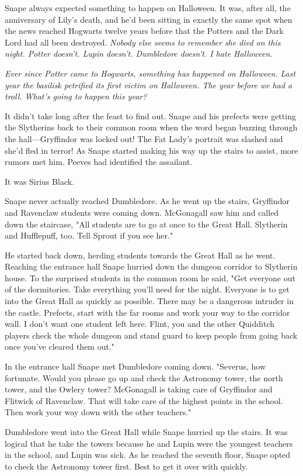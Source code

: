 Snape always expected something to happen on Halloween. It was, after all, the anniversary of Lily's death, and he'd been sitting in exactly the same spot when the news reached Hogwarts twelve years before that the Potters and the Dark Lord had all been destroyed. \emph{Nobody else seems to remember she died on this night. Potter doesn't. Lupin doesn't. Dumbledore doesn't. I hate Halloween.}

\emph{Ever since Potter came to Hogwarts, something has happened on Halloween. Last year the basilisk petrified its first victim on Halloween. The year before we had a troll. What's going to happen this year?}

It didn't take long after the feast to find out. Snape and his prefects were getting the Slytherins back to their common room when the word began buzzing through the hall—Gryffindor was locked out! The Fat Lady's portrait was slashed and she'd fled in terror! As Snape started making his way up the stairs to assist, more rumors met him. Peeves had identified the assailant.

It was Sirius Black.

Snape never actually reached Dumbledore. As he went up the stairs, Gryffindor and Ravenclaw students were coming down. McGonagall saw him and called down the staircase, "All students are to go at once to the Great Hall. Slytherin and Hufflepuff, too. Tell Sprout if you see her."

He started back down, herding students towards the Great Hall as he went. Reaching the entrance hall Snape hurried down the dungeon corridor to Slytherin house. To the surprised students in the common room he said, "Get everyone out of the dormitories. Take everything you'll need for the night. Everyone is to get into the Great Hall as quickly as possible. There may be a dangerous intruder in the castle. Prefects, start with the far rooms and work your way to the corridor wall. I don't want one student left here. Flint, you and the other Quidditch players check the whole dungeon and stand guard to keep people from going back once you've cleared them out."

In the entrance hall Snape met Dumbledore coming down. "Severus, how fortunate. Would you please go up and check the Astronomy tower, the north tower, and the Owlery tower? McGonagall is taking care of Gryffindor and Flitwick of Ravenclaw. That will take care of the highest points in the school. Then work your way down with the other teachers."

Dumbledore went into the Great Hall while Snape hurried up the stairs. It was logical that he take the towers because he and Lupin were the youngest teachers in the school, and Lupin was sick. As he reached the seventh floor, Snape opted to check the Astronomy tower first. Best to get it over with quickly.


